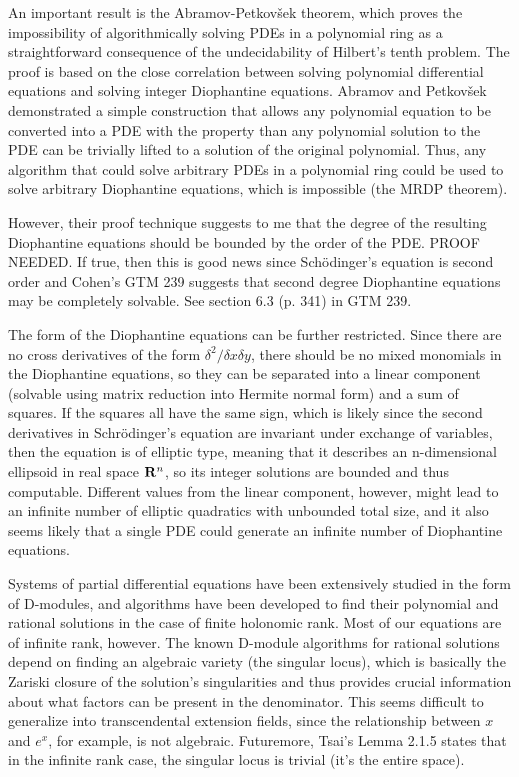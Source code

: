\documentclass{article}
\newcommand{\R}{\ensuremath{{\bf R}}}
\begin{document}
An important result is the Abramov-Petkov\v sek theorem, which proves
the impossibility of algorithmically solving PDEs in a polynomial ring
as a straightforward consequence of the undecidability of Hilbert's
tenth problem.  The proof is based on the close correlation between
solving polynomial differential equations and solving integer Diophantine
equations.  Abramov and Petkov\v sek demonstrated a simple
construction that allows any polynomial equation to be converted
into a PDE with the property than any polynomial solution to the PDE
can be trivially lifted to a solution of the original polynomial.
Thus, any algorithm that could solve arbitrary PDEs in a polynomial
ring could be used to solve arbitrary Diophantine equations, which
is impossible (the MRDP theorem).

However, their proof technique suggests to me that the degree of the
resulting Diophantine equations should be bounded by the order of the
PDE.  PROOF NEEDED.  If true, then this is good news since Sch\"odinger's
equation is second order and Cohen's GTM 239 suggests that second
degree Diophantine equations may be completely solvable.  See
section 6.3 (p. 341) in GTM 239.

The form of the Diophantine equations can be further restricted.
Since there are no cross derivatives of the form $\delta^2/\delta x \delta y$,
there should be no mixed monomials in the Diophantine equations,
so they can be separated into a linear component (solvable using
matrix reduction into Hermite normal form) and a sum of squares.
If the squares all have the same sign, which is likely since
the second derivatives in Schr\" odinger's equation are invariant
under exchange of variables, then the equation is of elliptic
type, meaning that it describes an n-dimensional ellipsoid
in real space $\R^n$, so its integer solutions are bounded
and thus computable.  Different values from the linear
component, however, might lead to an infinite number of
elliptic quadratics with unbounded total size, and it
also seems likely that a single PDE could generate an
infinite number of Diophantine equations.

Systems of partial differential equations have been extensively
studied in the form of D-modules, and algorithms have been developed
to find their polynomial and rational solutions in the case of finite
holonomic rank.  Most of our equations are of infinite rank, however.
The known D-module algorithms for rational solutions depend on finding
an algebraic variety (the singular locus), which is basically the
Zariski closure of the solution's singularities and thus provides
crucial information about what factors can be present in the
denominator.  This seems difficult to generalize into transcendental
extension fields, since the relationship between $x$ and $e^x$, for
example, is not algebraic.  Futuremore, Tsai's Lemma 2.1.5 states that in
the infinite rank case, the singular locus is trivial (it's the entire space).
\end{document}
